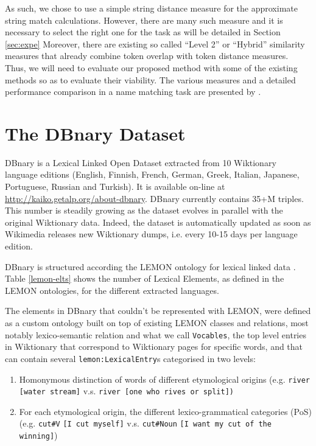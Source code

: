 \documentclass[10pt, a4paper]{article}
\begin{document}
As such, we chose to use a simple string distance measure for the approximate string match calculations. However, there are many such measure and it is necessary to select the right one for the task as will be detailed in Section \ref{sec:expe} Moreover, there are existing so called ``Level 2'' or ``Hybrid'' similarity measures that already combine token overlap with token distance measures. Thus, we will need to evaluate our proposed method with some of the existing methods so as to evaluate their viability. The various measures and a detailed performance comparison in a name matching task are presented by \cite{Cohen2003}.

\section{The DBnary Dataset}

DBnary is a Lexical Linked Open Dataset extracted from 10 Wiktionary language editions (English, Finnish, French, German, Greek, Italian, Japanese, Portuguese, Russian and Turkish). It is available on-line at \url{http://kaiko.getalp.org/about-dbnary}. DBnary currently contains 35+M triples. This number is steadily growing as the dataset evolves in parallel with the original Wiktionary data. Indeed, the dataset is automatically updated as soon as Wikimedia releases new Wiktionary dumps, i.e. every 10-15 days per language edition. 

DBnary is structured according the LEMON ontology for lexical linked data \cite{McCrae2012}. Table \ref{lemon-elts} shows the number of Lexical Elements, as defined in the LEMON ontologies, for the different extracted languages. 

The elements in DBnary that couldn't be represented with LEMON, were defined as a custom ontology built on top of existing LEMON classes and relations, most notably lexico-semantic relation and what we call \verb|Vocables|, the top level entries in Wiktionary that correspond to Wiktionary pages for specific words, and that can contain several \verb|lemon:LexicalEntry|s categorised in two levels:
\begin{enumerate}
	\item Homonymous distinction of words of different etymological origins (e.g. \verb|river [water stream]| v.s. \verb|river [one who rives or split])|
	\item For each etymological origin, the different lexico-grammatical categories (PoS) (e.g. \verb|cut#V| \verb|[I cut myself]| v.s. \verb|cut#Noun| \verb|[I want my cut of the winning]|)
\end{enumerate}
\end{document}
